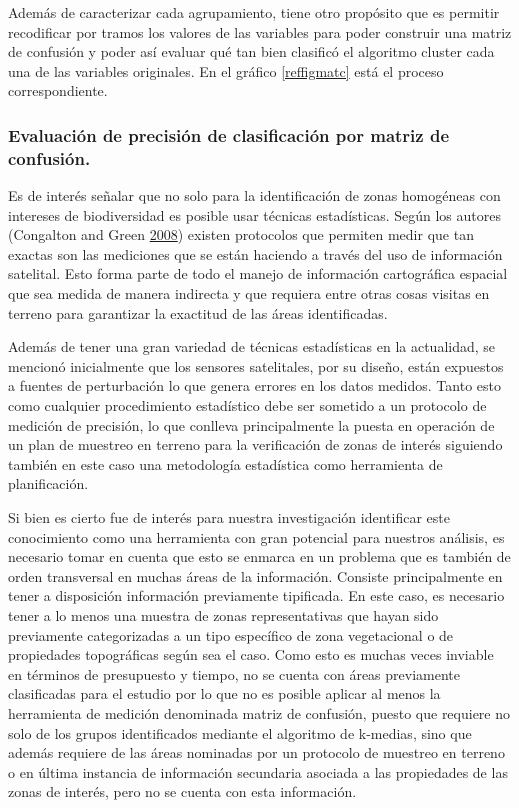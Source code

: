 \documentclass[]{article}
\begin{document}
Además de caracterizar cada agrupamiento, tiene otro propósito que es
permitir recodificar por tramos los valores de las variables para poder
construir una matriz de confusión y poder así evaluar qué tan bien
clasificó el algoritmo cluster cada una de las variables originales. En
el gráfico \ref{reffigmatc} está el proceso correspondiente.



\clearpage

\subsubsection{Evaluación de precisión de clasificación por matriz de
confusión.}\label{evaluacion-de-precision-de-clasificacion-por-matriz-de-confusion.}

Es de interés señalar que no solo para la identificación de zonas
homogéneas con intereses de biodiversidad es posible usar técnicas
estadísticas. Según los autores (Congalton and Green
\protect\hyperlink{ref-congalton_assessing_2008}{2008}) existen
protocolos que permiten medir que tan exactas son las mediciones que se
están haciendo a través del uso de información satelital. Esto forma
parte de todo el manejo de información cartográfica espacial que sea
medida de manera indirecta y que requiera entre otras cosas visitas en
terreno para garantizar la exactitud de las áreas identificadas.

Además de tener una gran variedad de técnicas estadísticas en la
actualidad, se mencionó inicialmente que los sensores satelitales, por
su diseño, están expuestos a fuentes de perturbación lo que genera
errores en los datos medidos. Tanto esto como cualquier procedimiento
estadístico debe ser sometido a un protocolo de medición de precisión,
lo que conlleva principalmente la puesta en operación de un plan de
muestreo en terreno para la verificación de zonas de interés siguiendo
también en este caso una metodología estadística como herramienta de
planificación.

Si bien es cierto fue de interés para nuestra investigación identificar
este conocimiento como una herramienta con gran potencial para nuestros
análisis, es necesario tomar en cuenta que esto se enmarca en un
problema que es también de orden transversal en muchas áreas de la
información. Consiste principalmente en tener a disposición información
previamente tipificada. En este caso, es necesario tener a lo menos una
muestra de zonas representativas que hayan sido previamente
categorizadas a un tipo específico de zona vegetacional o de propiedades
topográficas según sea el caso. Como esto es muchas veces inviable en
términos de presupuesto y tiempo, no se cuenta con áreas previamente
clasificadas para el estudio por lo que no es posible aplicar al menos
la herramienta de medición denominada matriz de confusión, puesto que
requiere no solo de los grupos identificados mediante el algoritmo de
k-medias, sino que además requiere de las áreas nominadas por un
protocolo de muestreo en terreno o en última instancia de información
secundaria asociada a las propiedades de las zonas de interés, pero no
se cuenta con esta información.
\end{document}
